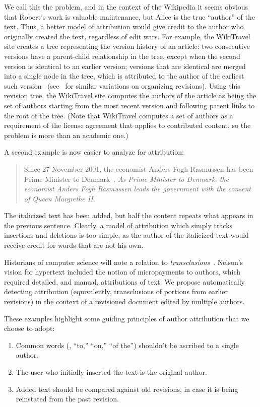 We call this the  problem,
and in the context of the Wikipedia it seems obvious that Robert's
work is valuable maintenance, but Alice is the true ``author'' of the text.
Thus, a better model of attribution would give credit
to the author who originally created the text,
regardless of edit wars.
For example, the WikiTravel site creates a tree representing
the version history of an article: two consecutive versions
have a parent-child relationship in the tree, except when
the second version is identical to an earlier version;
versions that are identical are merged into a single node
in the tree, which is attributed to the author of the earliest
such version~\cite{WikiTravelAuthorship}
(see~\cite{Ekstrand2009,Sabel2007} for similar variations
on organizing revisions).
Using this revision tree, the WikiTravel site computes the
authors of the article as being the set of authors starting
from the most recent version and following parent links
to the root of the tree.
(Note that WikiTravel computes a set of authors as a requirement
of the license agreement that applies to contributed content,
so the problem is more than an academic one.)


A second example is now easier to analyze for attribution:
%
\begin{quote}
Since 27 November 2001, the economist Anders Fogh Rasmussen
has been Prime Minister to Denmark~\cite{wiki:Denmark-Fogh}.
\textit{As Prime Minister to Denmark, the economist Anders Fogh Rasmussen
leads the government with the consent of Queen Margrethe II.}
\end{quote}
%
The italicized text has been added, but half the content repeats
what appears in the previous sentence.
Clearly, a model of attribution which simply tracks insertions
and deletions is too simple, as the author of the italicized
text would receive credit for words that are not his own.




Historians of computer science will note a relation
to \textit{transclusions}~\cite{Nelson81}.
Nelson's vision for hypertext included the notion
of micropayments to authors, which required detailed,
and manual, attributions of text.
We propose automatically detecting attribution
(equivalently, transclusions of portions from earlier revisions)
in the context of a revisioned document edited
by multiple authors.


These examples highlight some guiding principles of author attribution that
we choose to adopt:
\begin{enumerate}
\item Common words (\eg, ``to,'' ``on,'' ``of the'') shouldn't be
    ascribed to a single author.
\item The user who initially inserted the text is the original author.
\item Added text should be compared against old revisions, in case it is
being reinstated from the past revision.
\end{enumerate}


